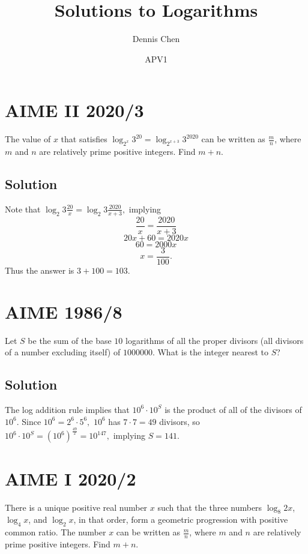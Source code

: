 \documentclass{article}
\title{Solutions to Logarithms}
\author{Dennis Chen}
\date{APV1}
\begin{document}
\maketitle

\toc

\pagebreak\section{AIME II 2020/3}

The value of $x$ that satisfies $\log_{2^x} 3^{20} = \log_{2^{x+3}} 3^{2020}$ can be written as $\frac{m}{n}$, where $m$ and $n$ are relatively prime positive integers. Find $m+n$.

\subsection{Solution}

Note that $\log_2{3}\frac{20}{x}=\log_2{3}\frac{2020}{x+3},$ implying
\[\frac{20}{x}=\frac{2020}{x+3}\]
\[20x+60=2020x\]
\[60=2000x\]
\[x=\frac{3}{100}.\]
Thus the answer is $3+100=103.$

\pagebreak\section{AIME 1986/8}

Let $S$ be the sum of the base $10$ logarithms of all the proper divisors (all divisors of a number excluding itself) of $1000000$. What is the integer nearest to $S$?

\subsection{Solution}

The log addition rule implies that $10^6\cdot 10^S$ is the product of all of the divisors of $10^6.$ Since $10^6=2^6\cdot 5^6,$ $10^6$ has $7\cdot 7=49$ divisors, so $10^6\cdot 10^S=(10^6)^{\frac{49}{2}}=10^{147},$ implying $S=141.$

\pagebreak\section{AIME I 2020/2}

There is a unique positive real number $x$ such that the three numbers $\log_8{2x}$, $\log_4{x}$, and $\log_2{x}$, in that order, form a geometric progression with positive common ratio. The number $x$ can be written as $\frac{m}{n}$, where $m$ and $n$ are relatively prime positive integers. Find $m + n$.
\end{document}
